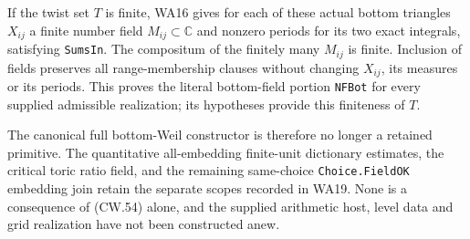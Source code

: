 If the twist set $T$ is finite, WA16 gives for each of these
actual bottom triangles $X_{ij}$ a finite number field
$M_{ij}\subset\mathbb C$ and nonzero periods for its two exact
integrals, satisfying \texttt{SumsIn}.  The compositum of the
finitely many $M_{ij}$ is finite.  Inclusion of fields preserves
all range-membership clauses without changing $X_{ij}$, its
measures or its periods.  This proves the literal bottom-field
portion \texttt{NFBot} for every supplied admissible realization;
its hypotheses provide this finiteness of $T$.

The canonical full bottom-Weil constructor is therefore no
longer a retained primitive.  The quantitative all-embedding
finite-unit dictionary estimates, the critical toric ratio field,
and the remaining same-choice \texttt{Choice.FieldOK} embedding
join retain the separate scopes recorded in WA19.  None is a
consequence of (CW.54) alone, and the supplied arithmetic host,
level data and grid realization have not been constructed anew.
